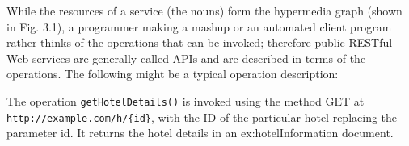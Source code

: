 \begin{spacing}{1.5}
While the resources of a service (the nouns) form the hypermedia graph (shown in Fig. 3.1), a programmer making a mashup or an automated client program rather thinks of the operations that can be invoked; therefore public RESTful Web services are generally called APIs and are described in terms of the operations. The following might be a typical operation description: 

The operation \texttt{getHotelDetails()} is invoked using the method GET at \\
\texttt{http://example.com/h/\{id\}}, with the ID of the particular hotel replacing the parameter id. It returns the hotel details in an ex:hotelInformation document.
\end{spacing}